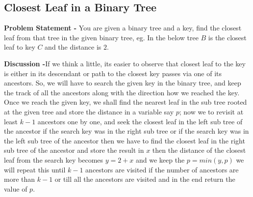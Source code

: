 \documentclass[12pt,a4paper,draft]{article}
\begin{document}
\subsection{Closest Leaf in a Binary Tree}
\textbf{Problem Statement -} You are given a binary tree and a key, find the closest leaf from that tree in the given binary tree, eg. In the below tree $B$ is the closest leaf to key $C$ and the distance is $2$.
\begin{center}
\end{center}
\textbf{Discussion -}If we think a little, its easier to observe that closest leaf to the key is either in its descendant or path to the closest key passes via one of its ancestors. So, we will have to search the given key in the binary tree, and keep the track of all the ancestors along with the direction how we reached the key. Once we reach the given key, we shall find the nearest leaf in the sub tree rooted at the given tree and store the distance in a variable say $p$; now we to revisit at least $k-1$ ancestors one by one, and seek the closest leaf in the left sub tree of the ancestor if the search key was in the right sub tree or if the search key was in the left sub tree of the ancestor then we have to find the closest leaf in the right sub tree of the ancestor and store the result in $x$ then the distance of the closest leaf from the search key becomes $y=2+x$ and we keep the $p=min(y,p)$ we will repeat this until $k-1$ ancestors are visited if the number of ancestors are more than $k-1$ or till all the ancestors are visited and in the end return the value of $p$.
\pagebreak
\end{document}
